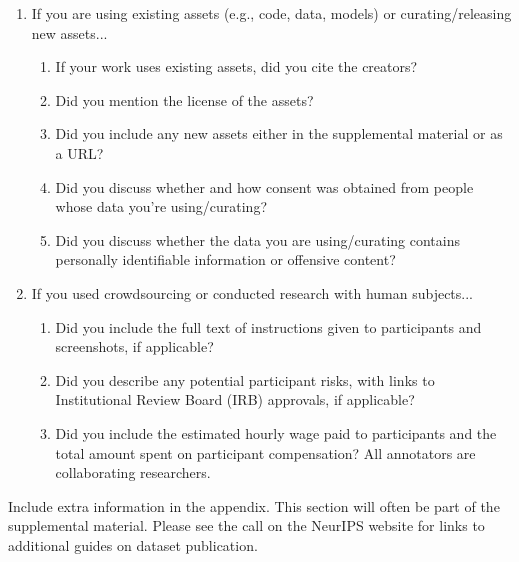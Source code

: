 \begin{enumerate}
\item If you are using existing assets (e.g., code, data, models) or curating/releasing new assets...
\begin{enumerate}
  \item If your work uses existing assets, did you cite the creators?
    \answerYes{}
  \item Did you mention the license of the assets?
  \item Did you include any new assets either in the supplemental material or as a URL?
    \answerYes{}
  \item Did you discuss whether and how consent was obtained from people whose data you're using/curating?
    \answerYes{}
  \item Did you discuss whether the data you are using/curating contains personally identifiable information or offensive content?
    \answerYes{}
\end{enumerate}

\item If you used crowdsourcing or conducted research with human subjects...
\begin{enumerate}
  \item Did you include the full text of instructions given to participants and screenshots, if applicable?
    \answerYes{}
  \item Did you describe any potential participant risks, with links to Institutional Review Board (IRB) approvals, if applicable?
    \answerNA{}
  \item Did you include the estimated hourly wage paid to participants and the total amount spent on participant compensation?
    \answerNA{} All annotators are collaborating researchers. 
\end{enumerate}

\end{enumerate}


\appendix


Include extra information in the appendix. This section will often be part of the supplemental material. Please see the call on the NeurIPS website for links to additional guides on dataset publication.

